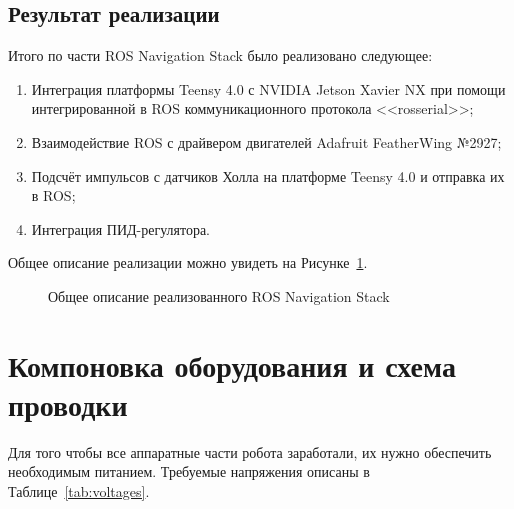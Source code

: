 \subsection{Результат реализации}
Итого по части ROS Navigation Stack было реализовано следующее:
\begin{enumerate}[beginpenalty=10000] %
  \item Интеграция платформы Teensy 4.0 с NVIDIA Jetson Xavier NX при помощи интегрированной в ROS коммуникационного протокола <<rosserial>>;
  \item Взаимодействие ROS с драйвером двигателей Adafruit FeatherWing №2927;
  \item Подсчёт импульсов с датчиков Холла на платформе Teensy 4.0 и отправка их в ROS;
  \item Интеграция ПИД-регулятора. 
\end{enumerate}

Общее описание реализации можно увидеть на Рисунке~\cref{fig:navstack}.

\begin{figure}[ht]
    \caption{Общее описание реализованного ROS Navigation Stack}\label{fig:navstack}
\end{figure}

\section{Компоновка оборудования и схема проводки}

Для того чтобы все аппаратные части робота заработали, их нужно обеспечить необходимым питанием. Требуемые напряжения описаны в Таблице~\cref{tab:voltages}.

